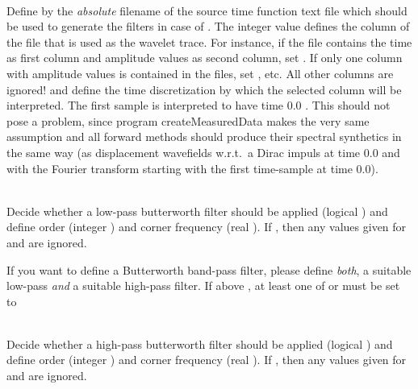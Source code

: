 \textbf{}\\
Define by  the \emph{absolute} filename of the source time function text file which should be 
used to generate the filters in case of  . 
The integer value  defines the column of the file that is used as the wavelet trace.
For instance, if the file contains the time as first column and amplitude values as second column, set
 . If only one column with amplitude values is contained in the files, set 
, etc. All other columns are ignored!
 and  define the time discretization by which the selected column will be interpreted.
The first sample is interpreted to have time $0.0$ . This should not pose a problem, since program
createMeasuredData makes the very same assumption and all forward methods should produce their 
spectral synthetics in the same way (as displacement wavefields w.r.t.\ a Dirac impuls at time 0.0
and with the Fourier transform starting with the first time-sample at time 0.0).

\textbf{}\\
Decide whether a low-pass butterworth filter should be applied (logical ) and 
define order (integer ) and corner frequency (real ).
If , then any values given for  and 
 are ignored.

If you want to define a Butterworth band-pass filter, please define \emph{both}, a suitable low-pass \emph{and} 
a suitable high-pass filter. If above  , at least 
one of  or  must be set to  

\textbf{}\\
Decide whether a high-pass butterworth filter should be applied (logical ) and 
define order (integer ) and corner frequency (real ).
If , then any values given for  and 
 are ignored.

